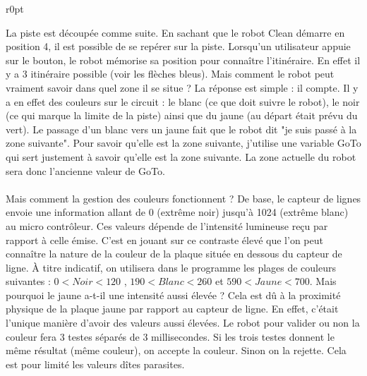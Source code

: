 \documentclass[12pt,oneside,a4paper]{book}
\begin{document}
\begin{minipage}[c]{\linewidth}
\begin{wrapfigure}{r}{0pt}
		\end{wrapfigure}

		La piste est découpée comme suite. En sachant que le robot Clean démarre en position 4, il est possible de se repérer sur la piste. Lorsqu'un utilisateur appuie sur le bouton, le robot mémorise sa position pour connaître l'itinéraire. En effet il y a 3 itinéraire possible (voir les flèches bleus). Mais comment le robot peut vraiment savoir dans quel zone il se situe ? La réponse est simple : il compte. Il y a en effet des couleurs sur le circuit : le blanc (ce que doit suivre le robot), le noir (ce qui marque la limite de la piste) ainsi que du jaune (au départ était prévu du vert). Le passage d'un blanc vers un jaune fait que le robot dit "je suis passé à la zone suivante". Pour savoir qu'elle est la zone suivante, j'utilise une variable GoTo qui sert justement à savoir qu'elle est la zone suivante. La zone actuelle du robot sera donc l'ancienne valeur de GoTo.
	\end{minipage}
	\paragraph{} Mais comment la gestion des couleurs fonctionnent ? De base, le capteur de lignes envoie une information allant de 0 (extrême noir) jusqu'à 1024 (extrême blanc) au micro contrôleur. Ces valeurs dépende de l'intensité lumineuse reçu par rapport à celle émise. C'est en jouant sur ce contraste élevé que l'on peut connaître la nature de la couleur de la plaque située en dessous du capteur de ligne. À titre indicatif, on utilisera dans le programme les plages de couleurs suivantes : $ 0 < Noir < 120$ , $190 < Blanc < 260 $ et $590 < Jaune < 700$. Mais pourquoi le jaune a-t-il une intensité aussi élevée ? Cela est dû à la proximité physique de la plaque jaune par rapport au capteur de ligne. En effet, c'était l'unique manière d'avoir des valeurs aussi élevées. Le robot pour valider ou non la couleur fera 3 testes séparés de 3 millisecondes. Si les trois testes donnent le même résultat (même couleur), on accepte la couleur. Sinon on la rejette. Cela est pour limité les valeurs dîtes parasites.
\end{document}
